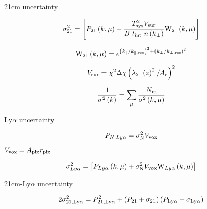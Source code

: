 21cm uncertainty

\begin{equation}
\sigma_{21}^2 = \left[ P_{21}\left(k, \mu \right) + \frac{T^2_{\rm sys} V_{\rm sur}}{B \ t_{\rm int} \ n \left(k_{\perp}\right)} {\rm W}_{21}\left(k, \mu \right) \right]
\end{equation}

\begin{equation}
{\rm W}_{21}\left(k, \mu \right) = e^{\left(k_{\parallel} / k_{\parallel, \rm res} \right)^2 + \left(k_{\perp} / k_{\perp, \rm res} \right)^2}
\end{equation}

\begin{equation}
V_{\rm sur} = \chi^2 \Delta \chi \left( \lambda_{21} \left( z \right)^2 / A_e\right)^2
\end{equation}

\begin{equation}
\frac{1}{\sigma^2 \left( k \right)} = \sum_{\mu} \frac{N_{\rm m}}{\sigma^2 \left( k, \mu \right)}
\end{equation}



Ly$\alpha$ uncertainty

\begin{equation}
P_{N, Ly\alpha} = \sigma_{\rm N}^2 V_{\rm vox}
\end{equation}

$V_{\rm vox} = A_{\rm pix} r_{\rm pix}$

\begin{equation}
\sigma_{Ly\alpha}^2 = \left[ P_{Ly\alpha}\left(k, \mu \right) + \sigma_{\rm N}^2 V_{\rm vox} {\rm W}_{Ly\alpha}\left(k, \mu \right) \right]
\end{equation}

21cm-Ly$\alpha$ uncertainty


\begin{equation}
    2 \sigma^2_{21, \rm Ly\alpha} = P^2_{21, \rm Ly\alpha} +
      \left(P_{21} + \sigma_{21} \right) \left( P_{\rm Ly\alpha} + \sigma_{\rm Ly\alpha}\right)
\end{equation}
